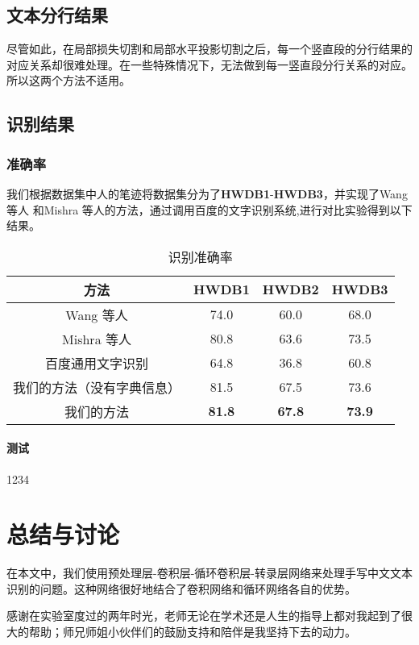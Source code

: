 \documentclass[winfonts]{njuthesis}
\begin{document}
\section{文本分行结果}
尽管如此，在局部损失切割和局部水平投影切割之后，每一个竖直段的分行结果的对应关系却很难处理。在一些特殊情况下，无法做到每一竖直段分行关系的对应。所以这两个方法不适用。




\section{识别结果}

\subsection{准确率}
我们根据数据集中人的笔迹将数据集分为了\textbf{HWDB1}-\textbf{HWDB3}，并实现了Wang 等人\cite{wang2012end} 和Mishra 等人\cite{mishra2012scene}的方法，通过调用百度的文字识别系统\cite{baiduapi},进行对比实验得到以下结果。

\vspace{0.2cm}
\begin{table}[htbp]
\setlength{\belowcaptionskip}{5pt}
  \centering
  \begin{tabular}{cccc}
    \toprule
    \textbf{方法} & \textbf{HWDB1} & \textbf{HWDB2} & \textbf{HWDB3} \\
    \midrule
    Wang 等人\cite{wang2012end}   			& 74.0 & 60.0 & 68.0  \\
    Mishra 等人\cite{mishra2012scene}		 	& 80.8 & 63.6 & 73.5  \\
    百度通用文字识别\cite{baiduapi}		& 64.8 & 36.8 & 60.8 \\
    \midrule
    我们的方法（没有字典信息）& 81.5 & 67.5 & 73.6  \\
    我们的方法	  		& \textbf{81.8} & \textbf{67.8} & \textbf{73.9}  \\
    \bottomrule
  \end{tabular}
  \vspace{0.2cm}
  \caption{识别准确率}\label{table:result}
\end{table}

\subsubsection{测试}
1234

\chapter{总结与讨论}
在本文中，我们使用预处理层-卷积层-循环卷积层-转录层网络来处理手写中文文本识别的问题。这种网络很好地结合了卷积网络和循环网络各自的优势。



\begin{acknowledgement}
感谢在实验室度过的两年时光，老师无论在学术还是人生的指导上都对我起到了很大的帮助；师兄师姐小伙伴们的鼓励支持和陪伴是我坚持下去的动力。
\end{acknowledgement}

\end{document}
